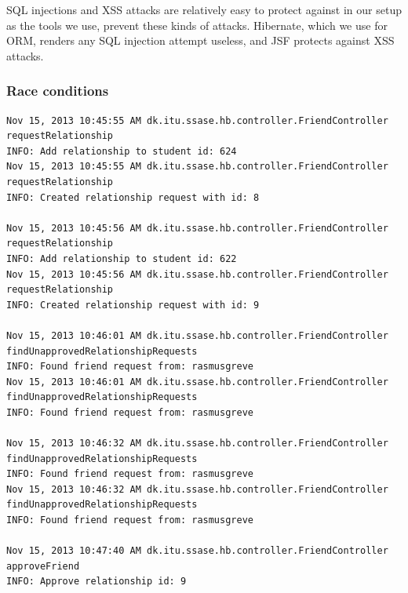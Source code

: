 \documentclass[a4paper]{article}
\begin{document}
SQL injections and XSS attacks are relatively easy to protect against in our setup as the tools we use, prevent these kinds of attacks. Hibernate, which we use for ORM, renders any SQL injection attempt useless, and JSF protects against XSS attacks.

\subsubsection{Race conditions}
\begin{verbatim}
Nov 15, 2013 10:45:55 AM dk.itu.ssase.hb.controller.FriendController requestRelationship
INFO: Add relationship to student id: 624
Nov 15, 2013 10:45:55 AM dk.itu.ssase.hb.controller.FriendController requestRelationship
INFO: Created relationship request with id: 8

Nov 15, 2013 10:45:56 AM dk.itu.ssase.hb.controller.FriendController requestRelationship
INFO: Add relationship to student id: 622
Nov 15, 2013 10:45:56 AM dk.itu.ssase.hb.controller.FriendController requestRelationship
INFO: Created relationship request with id: 9

Nov 15, 2013 10:46:01 AM dk.itu.ssase.hb.controller.FriendController findUnapprovedRelationshipRequests
INFO: Found friend request from: rasmusgreve
Nov 15, 2013 10:46:01 AM dk.itu.ssase.hb.controller.FriendController findUnapprovedRelationshipRequests
INFO: Found friend request from: rasmusgreve

Nov 15, 2013 10:46:32 AM dk.itu.ssase.hb.controller.FriendController findUnapprovedRelationshipRequests
INFO: Found friend request from: rasmusgreve
Nov 15, 2013 10:46:32 AM dk.itu.ssase.hb.controller.FriendController findUnapprovedRelationshipRequests
INFO: Found friend request from: rasmusgreve

Nov 15, 2013 10:47:40 AM dk.itu.ssase.hb.controller.FriendController approveFriend
INFO: Approve relationship id: 9
\end{verbatim}
\end{document}
